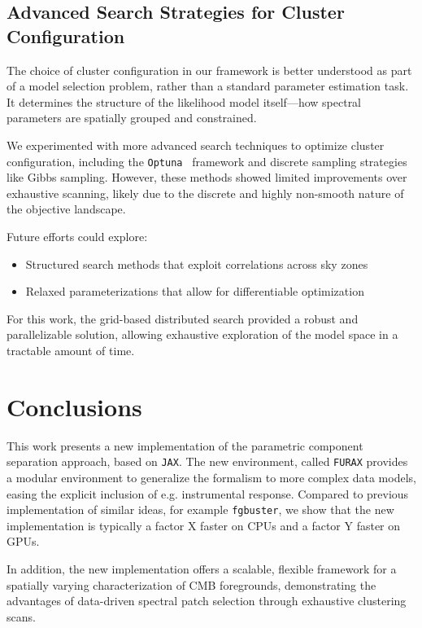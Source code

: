 \documentclass[fleqn,usenatbib]{mnras}
\begin{document}
\subsection*{Advanced Search Strategies for Cluster Configuration}

The choice of cluster configuration in our framework is better understood as part of a model selection problem, rather than a standard parameter estimation task. It determines the structure of the likelihood model itself—how spectral parameters are spatially grouped and constrained.

We experimented with more advanced search techniques to optimize cluster configuration, including the \texttt{Optuna}~\citep{OPTUNA} framework and discrete sampling strategies like Gibbs sampling. However, these methods showed limited improvements over exhaustive scanning, likely due to the discrete and highly non-smooth nature of the objective landscape.

Future efforts could explore:
\begin{itemize}
    \item Structured search methods that exploit correlations across sky zones
    \item Relaxed parameterizations that allow for differentiable optimization
\end{itemize}

For this work, the grid-based distributed search provided a robust and parallelizable solution, allowing exhaustive exploration of the model space in a tractable amount of time.

\section{Conclusions}
\label{sec:conclusion}

This work presents a new implementation of the parametric component separation approach, based on \texttt{JAX}. The new environment, called \texttt{FURAX} provides a modular environment to generalize the formalism to more complex data models, easing the explicit inclusion of e.g. instrumental response. Compared to previous implementation of similar ideas, for example \texttt{fgbuster}, we show that the new implementation is typically a factor X faster on CPUs and a factor Y faster on GPUs. 

In addition, the new implementation offers a scalable, flexible framework for a spatially varying characterization of CMB foregrounds, demonstrating the advantages of data-driven spectral patch selection through exhaustive clustering scans.
\end{document}
